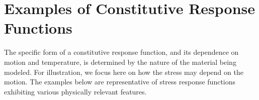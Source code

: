 \section{Examples of Constitutive Response Functions}

The specific form of a constitutive response function, and its dependence on motion and temperature, is determined by the nature of the material being modeled. For illustration, we focus here on how the stress may depend on the motion. The examples below are representative of stress response functions exhibiting various physically relevant features.

\vspace{0.5cm}

